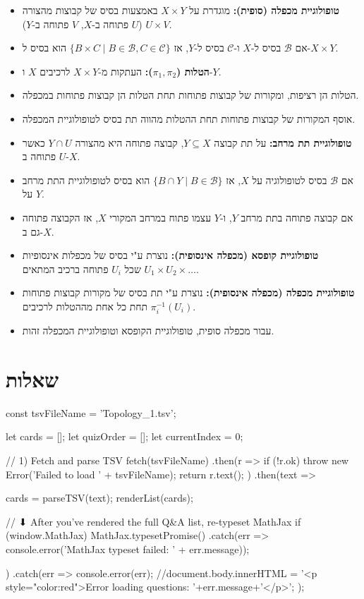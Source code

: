 \documentclass{tstextbook}
\begin{document}
\begin{summary}
  \begin{itemize}
    \item \textbf{טופולוגיית מכפלה (סופית):} מוגדרת על \(X \times Y\) באמצעות בסיס של קבוצות מהצורה \(U \times V\) (\(U\) פתוחה ב-\(X\), \(V\) פתוחה ב-\(Y\)).
    \item אם \(\mathcal{B}\) בסיס ל-\(X\) ו-\(\mathcal{C}\) בסיס ל-\(Y\), אז \(\{B \times C \mid B \in \mathcal{B}, C \in \mathcal{C}\}\) הוא בסיס ל-\(X \times Y\).
    \item \textbf{הטלות (\(\pi_1, \pi_2\)):} העתקות מ-\(X \times Y\) לרכיבים \(X\) ו-\(Y\).
    \item הטלות הן רציפות, ומקורות של קבוצות פתוחות תחת הטלות הן קבוצות פתוחות במכפלה.
    \item אוסף המקורות של קבוצות פתוחות תחת ההטלות מהווה תת בסיס לטופולוגיית המכפלה.
    \item \textbf{טופולוגיית תת מרחב:} על תת קבוצה \(Y \subseteq X\), קבוצה פתוחה היא מהצורה \(Y \cap U\) כאשר \(U\) פתוחה ב-\(X\).
    \item אם \(\mathcal{B}\) בסיס לטופולוגיה על \(X\), אז \(\{B \cap Y \mid B \in \mathcal{B}\}\) הוא בסיס לטופולוגיית התת מרחב על \(Y\).
    \item אם קבוצה פתוחה בתת מרחב \(Y\), ו-\(Y\) עצמו פתוח במרחב המקורי \(X\), אז הקבוצה פתוחה גם ב-\(X\).
    \item \textbf{טופולוגיית קופסא (מכפלה אינסופית):} נוצרת ע"י בסיס של מכפלות אינסופיות \(U_1 \times U_2 \times \dots\) שכל \(U_i\) פתוחה ברכיב המתאים.
    \item \textbf{טופולוגיית מכפלה (מכפלה אינסופית):} נוצרת ע"י תת בסיס של מקורות קבוצות פתוחות תחת כל אחת מההטלות לרכיבים \(\pi_i^{-1}(U_i)\).
    \item עבור מכפלה סופית, טופולוגיית הקופסא וטופולוגיית המכפלה זהות.
  \end{itemize}
\end{summary}
\section{שאלות}


    const tsvFileName = 'Topology_1.tsv';

    let cards = [];
    let quizOrder = [];
    let currentIndex = 0;

    // 1) Fetch and parse TSV
fetch(tsvFileName)
  .then(r => {
    if (!r.ok) throw new Error('Failed to load ' + tsvFileName);
    return r.text();
  })
  .then(text => {
    cards = parseTSV(text);
    renderList(cards);

    // ⬇ After you’ve rendered the full Q&A list, re-typeset MathJax
    if (window.MathJax) {
      MathJax.typesetPromise()
        .catch(err => console.error('MathJax typeset failed: ' + err.message));
    }
  })
  .catch(err => {
    console.error(err);
    //document.body.innerHTML =  '<p style="color:red">Error loading questions: '+err.message+'</p>';
  });
\end{document}
